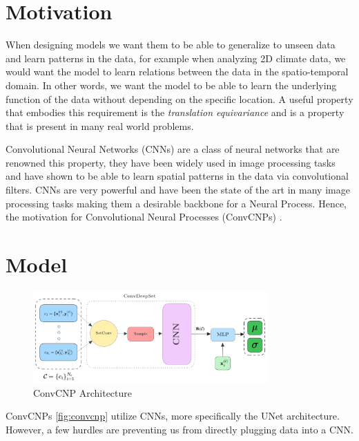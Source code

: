 \documentclass[../../main.tex]{subfiles}
\begin{document}

\section{Motivation}

When designing models we want them to be able to generalize to unseen data and learn patterns in the data, for example when analyzing 2D climate data, we would want the model to learn relations between the data in the spatio-temporal domain. In other words, we want the model to be able to learn the underlying function of the data without depending on the specific location. A useful property that embodies this requirement is the \textit{translation equivariance} and is a property that is present in many real world problems.

Convolutional Neural Networks (CNNs) are a class of neural networks that are renowned this property, they have been widely used in image processing tasks and have shown to be able to learn spatial patterns in the data via convolutional filters. CNNs are very powerful and have been the state of the art in many image processing tasks making them a desirable backbone for a Neural Process. Hence, the motivation for Convolutional Neural Processes (ConvCNPs) \cite{gordon2020convolutional}.

\section{Model}

\begin{figure}[H]
	\centering
	\includegraphics[width=0.8\textwidth]{convcnp.png}
	\caption{ConvCNP Architecture}
	\label{fig:convcnp}
\end{figure}


ConvCNPs \cite{gordon2020convolutional} \autoref{fig:convcnp} utilize CNNs, more specifically the UNet architecture. However, a few hurdles are preventing us from directly plugging data into a CNN.
\end{document}
